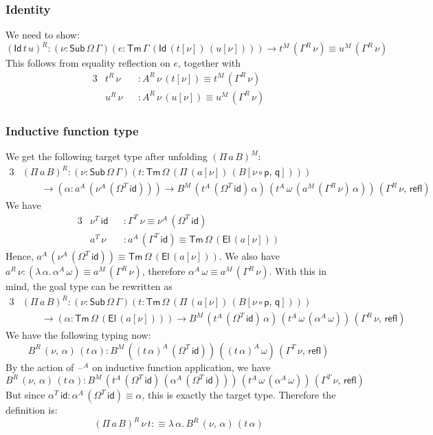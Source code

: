 \documentclass[12pt,a4paper,twoside,openany]{book}
\theoremstyle{remark}
\theoremstyle{definition}
\theoremstyle{theorem}
\newcommand{\refl}{\mathsf{refl}}
\newcommand{\id}{\mathsf{id}}
\newcommand{\Sub}{\mathsf{Sub}}
\newcommand{\Tm}{\mathsf{Tm}}
\newcommand{\El}{\mathsf{El}}
\newcommand{\Id}{\mathsf{Id}}
\newcommand{\blank}{\mathord{\hspace{1pt}\text{--}\hspace{1pt}}}
\newcommand{\p}{\mathsf{p}}
\newcommand{\q}{\mathsf{q}}
\newcommand{\defn}{:\equiv}
\begin{document}
\subsubsection{Identity}

We need to show:
\[
(\Id\,t\,u)^R : (\nu : \Sub\,\Omega\,\Gamma)(e : \Tm\,\Gamma\,(\Id\,(t[\nu])\,(u[\nu])))
  \to t^M\,(\Gamma^R\,\nu) \equiv u^M\,(\Gamma^R\,\nu)
  \]
This follows from equality reflection on $e$, together with
\begin{alignat*}{3}
  & t^R\,\nu &&: A^R\,\nu\,(t[\nu]) \equiv t^M\,(\Gamma^R\,\nu)\\
  & u^R\,\nu &&: A^R\,\nu\,(u[\nu]) \equiv u^M\,(\Gamma^R\,\nu)
\end{alignat*}

\subsubsection{Inductive function type}
We get the following target type after unfolding $(\Pi\,a\,B)^M$:
\begin{alignat*}{3}
 &(\Pi\,a\,B)^R : (\nu : \Sub\,\Omega\,\Gamma)(t : \Tm\,\Omega\,(\Pi\,(a[\nu])\,(B[\nu\circ\p,\,\q])))\\
 & \hspace{2em}\to (\alpha : a^A\,(\nu^A\,(\Omega^T\,\id))) \to B^M\,(t^A\,(\Omega^T\,\id)\,\alpha)\,(t^A\,\omega\,(a^M\,(\Gamma^R\,\nu)\,\alpha))\,(\Gamma^R\,\nu,\,\refl)
\end{alignat*}
We have
\begin{alignat*}{3}
  & \nu^T\,\id &&: \Gamma^T\,\nu \equiv \nu^A\,(\Omega^T\,\id) \\
  & a^T\,\nu   &&: a^A\,(\Gamma^T\,\id) \equiv \Tm\,\Omega\,(\El\,(a[\nu]))
\end{alignat*}
Hence, $a^A\,(\nu^A\,(\Omega^T\,\id)) \equiv \Tm\,\Omega\,(\El\,(a[\nu]))$. We
also have $a^R\,\nu : (\lambda\,\alpha.\,\alpha^A\,\omega) \equiv a^M\,(\Gamma^R\,\nu)$, therefore
$\alpha^A\,\omega \equiv a^M\,(\Gamma^R\,\nu)$. With this in mind, the goal type can be rewritten as
\begin{alignat*}{3}
 &(\Pi\,a\,B)^R : (\nu : \Sub\,\Omega\,\Gamma)(t : \Tm\,\Omega\,(\Pi\,(a[\nu])\,(B[\nu\circ\p,\,\q])))\\
 & \hspace{2em}\to (\alpha : \Tm\,\Omega\,(\El\,(a[\nu]))) \to B^M\,(t^A\,(\Omega^T\,\id)\,\alpha)\,(t^A\,\omega\,(\alpha^A\,\omega))\,(\Gamma^R\,\nu,\,\refl)
\end{alignat*}
We have the following typing now:
\[
  B^R\,(\nu,\,\alpha)\,(t\,\alpha) : B^M\,((t\,\alpha)^A\,(\Omega^T\,\id))\,((t\,\alpha)^A\,\omega)\,(\Gamma^T\,\nu,\,\refl)
\]
By the action of $\blank^A$ on inductive function application, we have
\[
   B^R\,(\nu,\,\alpha)\,(t\,\alpha) :
      B^M\,(t^A\,(\Omega^T\,\id)\,(\alpha^A\,(\Omega^T\,\id)))\,(t^A\,\omega\,(\alpha^A\,\omega))\,(\Gamma^T\,\nu,\,\refl)
\]
But since $\alpha^T\,\id : \alpha^A\,(\Omega^T\,\id) \equiv \alpha$, this is
exactly the target type. Therefore the definition is:
\[
  (\Pi\,a\,B)^R\,\nu\,t \defn \lambda\,\alpha.\,B^R\,(\nu,\,\alpha)\,(t\,\alpha)
\]
\end{document}
